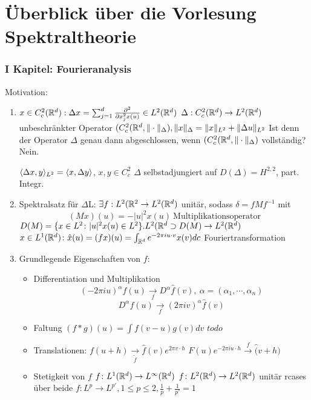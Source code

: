 \chapter*{{\"U}berblick über die Vorlesung Spektraltheorie} 

\setcounter{section}{1}


\subsection*{I Kapitel: Fourieranalysis}

Motivation:
\begin{enumerate}[label=\alph*\upshape)]
	\item $x \in C_{c}^{2}(\mathbb{R}^{d}) : \Delta x = \sum_{j = 1}^{d} \frac{\partial^{2}}{\partial x_{j}^{2} x(u)} \in L^{2}(\mathbb{R}^{d})$
		$\Delta : C_{c}^{2}(\mathbb{R}^{d}) \rightarrow L^{2}(\mathbb{R}^{d}) $ unbeschränkter Operator
		$(C_{c}^{2}(\mathbb{R}^{d}, \| \cdot \|_{\Delta}), \| x \|_{\Delta} = \| x \|_{L^{2}} + \| \Delta u \|_{L^{2}}$
		Ist denn der Operator $\Delta$ genau dann abgeschlossen, wenn $(C_{c}^{2}(\mathbb{R}^{d}, \| \cdot \|_{\Delta})$ vollständig? Nein.

		$\langle \Delta x , y \rangle_{L^{2}} = \langle x , \Delta y \rangle$, $x, y \in C_{c}^{2}$ $\Delta$ selbstadjungiert auf $D(\Delta) = H^{2, 2}$, part. Integr.
	\item Spektralsatz für $\Delta$L: $\exists f: L^{2}(\mathbb{R}^{2} \rightarrow L^{2}(\mathbb{R}^{d})$ unitär, sodass $\delta = f M f^{-1}$ mit
			\[ (M x)(u) = - | u|^{2} x(u) ~ \text{Multiplikationsoperator} \]
		$D(M) = \{ x \in L^{2} \colon | u|^{2} x(u) \in L^{2} \}. L^{2}(\mathbb{R}^{d} \supset D(M) \rightarrow L^{2}(\mathbb{R}^{d})$
		$x \in L^{1}(\mathbb{R}^{d}) \colon \hat x (u) = (f x)(u) = \int_{\mathbb{R}^{d}} e^{-2 \pi i u \cdot v} x(v) dc$ Fouriertransformation
	\item Grundlegende Eigenschaften von $f$:
		\begin{itemize}
			\item Differentiation und Multiplikation
				\[ (- 2 \pi i u)^{\alpha} f(u) \xrightarrow[f]{} D^{\alpha} \hat f(v), ~ \alpha = (\alpha_{1}, \cdots, \alpha_{n}) \]
				\[ D^{\alpha} f(u) \xrightarrow[f]{} (2 \pi i v)^{\alpha} \hat f(v)\]
			\item Faltung
				$( f \ast g)(u) = \int f(v - u) g(v) dv$
				$todo$ %
			\item Translationen: $f(u + h ) \xrightarrow[\tilde f]{} \hat f(v) e^{2 \pi v \cdot h}$
				$F(u) e^{- 2 \pi i u \cdot h} \xrightarrow[]{f} \hat(v + h)$
			\item Stetigkeit von $f$
				$ f \colon L^{1}(\mathbb{R}^{d}) \rightarrow L^{\infty}(\mathbb{R}^{d})$
				$ f \colon L^{2} (\mathbb{R}^{d}) \rightarrow L^{2}(\mathbb{R}^{d})$ unitär
				rcases über beide $f \colon L^{p} \rightarrow L^{p'}, 1 \leq p \leq 2, \frac{1}{p} + \frac{1}{p'} = 1$
		\end{itemize}
\end{enumerate}


